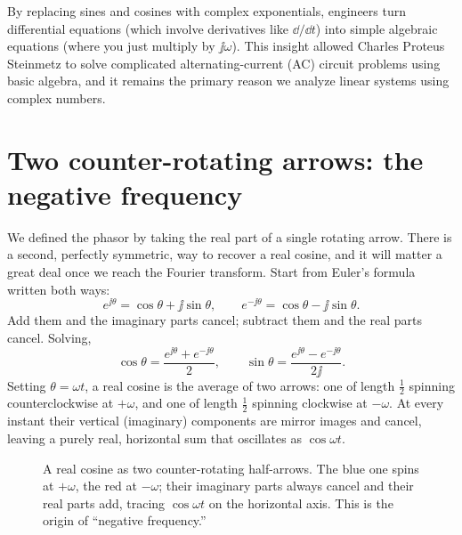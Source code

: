 By replacing sines and cosines with complex exponentials, engineers turn differential equations (which involve derivatives like $\dd/\dd t$) into simple algebraic equations (where you just multiply by $\jj\omega$). This insight allowed Charles Proteus Steinmetz to solve complicated alternating-current (AC) circuit problems using basic algebra, and it remains the primary reason we analyze linear systems using complex numbers.

\section{Two counter-rotating arrows: the negative frequency}
\label{ch04:negfreq}

We defined the phasor by taking the real part of a single rotating arrow. There is a second,
perfectly symmetric, way to recover a real cosine, and it will matter a great deal once we reach the
Fourier transform. Start from Euler's formula written both ways:
\[
  e^{\jj\theta} = \cos\theta + \jj\sin\theta, \qquad e^{-\jj\theta} = \cos\theta - \jj\sin\theta.
\]
Add them and the imaginary parts cancel; subtract them and the real parts cancel. Solving,
\[
  \boxed{\;\cos\theta = \frac{e^{\jj\theta} + e^{-\jj\theta}}{2}, \qquad
         \sin\theta = \frac{e^{\jj\theta} - e^{-\jj\theta}}{2\jj}.\;}
\]
Setting $\theta = \omega t$, a real cosine is the average of two arrows: one of length $\tfrac12$
spinning counterclockwise at $+\omega$, and one of length $\tfrac12$ spinning clockwise at
$-\omega$. At every instant their vertical (imaginary) components are mirror images and cancel,
leaving a purely real, horizontal sum that oscillates as $\cos\omega t$.

\begin{figure}[H]
\centering
{}
\caption{A real cosine as two counter-rotating half-arrows. The blue one spins at $+\omega$, the
red at $-\omega$; their imaginary parts always cancel and their real parts add, tracing
$\cos\omega t$ on the horizontal axis. This is the origin of ``negative frequency.''}
\label{ch04:fig-counter-rotate}
\end{figure}

